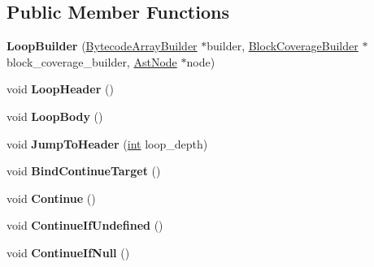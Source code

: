 \subsection*{Public Member Functions}
\begin{DoxyCompactItemize}
\item 
\mbox{\label{classv8_1_1internal_1_1interpreter_1_1LoopBuilder_ace7c782a0ddc60c96e7dc47cdfbcedfc}} 
{\bfseries Loop\+Builder} (\mbox{\hyperlink{classv8_1_1internal_1_1interpreter_1_1BytecodeArrayBuilder}{Bytecode\+Array\+Builder}} $\ast$builder, \mbox{\hyperlink{classv8_1_1internal_1_1interpreter_1_1BlockCoverageBuilder}{Block\+Coverage\+Builder}} $\ast$block\+\_\+coverage\+\_\+builder, \mbox{\hyperlink{classv8_1_1internal_1_1AstNode}{Ast\+Node}} $\ast$node)
\item 
\mbox{\label{classv8_1_1internal_1_1interpreter_1_1LoopBuilder_a50659c64d1ce7644d371a1cd7c4c4a4d}} 
void {\bfseries Loop\+Header} ()
\item 
\mbox{\label{classv8_1_1internal_1_1interpreter_1_1LoopBuilder_a237df4f4770559f7c894da2f8eac2c78}} 
void {\bfseries Loop\+Body} ()
\item 
\mbox{\label{classv8_1_1internal_1_1interpreter_1_1LoopBuilder_a292dd0039bc778be184f991d28c36b10}} 
void {\bfseries Jump\+To\+Header} (\mbox{\hyperlink{classint}{int}} loop\+\_\+depth)
\item 
\mbox{\label{classv8_1_1internal_1_1interpreter_1_1LoopBuilder_a84605898109397257844ea460d5dd3a8}} 
void {\bfseries Bind\+Continue\+Target} ()
\item 
\mbox{\label{classv8_1_1internal_1_1interpreter_1_1LoopBuilder_a1a97f1c6a3a86a29fe33d23daa11e570}} 
void {\bfseries Continue} ()
\item 
\mbox{\label{classv8_1_1internal_1_1interpreter_1_1LoopBuilder_a0da593c562dfbcc5a0494e2dc4a053e9}} 
void {\bfseries Continue\+If\+Undefined} ()
\item 
\mbox{\label{classv8_1_1internal_1_1interpreter_1_1LoopBuilder_a6e65fd77f0f67bf0dd741e0f72bcb3a4}} 
void {\bfseries Continue\+If\+Null} ()
\end{DoxyCompactItemize}
